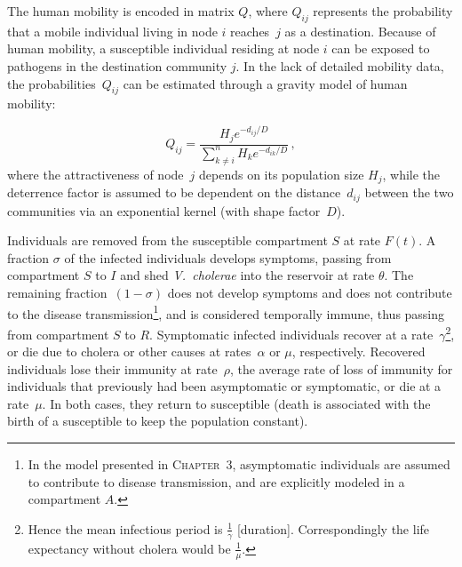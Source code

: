 The human mobility is encoded in matrix $Q$, where $Q_{ij}$ represents the probability that a mobile individual living in node $i$ reaches~$j$ as a destination. Because of human mobility, a susceptible individual residing at node $i$ can be exposed to pathogens in the destination community $j$. 
In the lack of detailed mobility data, the probabilities~$Q_{ij}$ can be estimated through a gravity model of human mobility\cite{Erlander:GravityModelTransportation:1990}:

\begin{equation}
Q_{ij} = \frac{H_j e^{-d_{ij}/D}}{\sum_{k \neq i}^n H_k e^{-d_{ik}/D}} \, ,
\label{eq:mob}
\end{equation}
where the attractiveness of node~$j$ depends on its population size $H_j$, while the deterrence factor is assumed to be dependent on the distance~$d_{ij}$ between the two communities via an exponential kernel (with shape factor~$D$).  

Individuals are removed from the susceptible compartment $S$ at rate $F(t)$.  A fraction $\sigma$ of the infected individuals develops symptoms, passing from compartment $S$ to $I$ and shed \textit{V.~cholerae} into the reservoir at rate $\theta$.  The remaining fraction~$(1-\sigma)$ does not develop symptoms and does not contribute to the disease transmission\footnote{In the model presented in \textsc{Chapter~3}, asymptomatic individuals are assumed to contribute to disease transmission, and are explicitly modeled in a compartment $A$.}, and is considered temporally immune, thus passing from compartment $S$ to $R$.  Symptomatic infected individuals recover at a rate~$\gamma$\footnote{Hence the mean infectious period is $\frac{1}{\gamma}$ [duration]. Correspondingly the life expectancy without cholera would be $\frac{1}{\mu}$.}, or die due to cholera or other causes at rates~$\alpha$ or $\mu$, respectively.
Recovered individuals lose their immunity at rate~$\rho$, the average rate of loss of immunity for individuals that previously had been asymptomatic or symptomatic, or die at a rate~$\mu$. In both cases, they return to susceptible (death is associated with the birth of a susceptible to keep the population constant).

